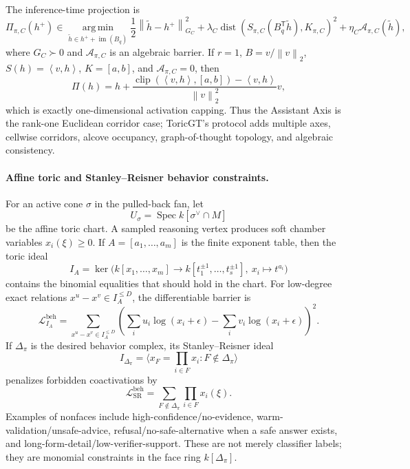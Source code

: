 \documentclass[11pt]{article}
\theoremstyle{definition}
\theoremstyle{plain}
\theoremstyle{remark}
\numberwithin{equation}{section}
\newcommand{\argmin}{\operatorname*{arg\,min}}
\newcommand{\dist}{\operatorname{dist}}
\newcommand{\norm}[1]{\left\lVert #1\right\rVert}
\newcommand{\ip}[2]{\left\langle #1,#2\right\rangle}
\newcommand{\transpose}{^{\mathsf T}}
\newcommand{\Spec}{\operatorname{Spec}}
\begin{document}
The inference-time projection is
\begin{equation}
  \Pi_{\pi,C}(h^+)
  \in
  \argmin_{\tilde h\in h^++\operatorname{im}(B_q)}
  \frac12\norm{\tilde h-h^+}_{G_C}^2
  +\lambda_C\dist(S_{\pi,C}(B_q\transpose\tilde h),K_{\pi,C})^2
  +\eta_C\mathcal A_{\pi,C}(\tilde h),
  \label{eq:bgg-behavior-projection}
\end{equation}
where $G_C\succ0$ and $\mathcal A_{\pi,C}$ is an algebraic barrier.  If $r=1$, $B=v/\norm{v}_2$, $S(h)=\ip{v}{h}$, $K=[a,b]$, and $\mathcal A_{\pi,C}=0$, then
\begin{equation}
  \Pi(h)=h+\frac{\operatorname{clip}(\ip{v}{h},[a,b])-\ip{v}{h}}{\norm{v}_2^2}v,
\end{equation}
which is exactly one-dimensional activation capping.  Thus the Assistant Axis is the rank-one Euclidean corridor case; ToricGT's protocol adds multiple axes, cellwise corridors, alcove occupancy, graph-of-thought topology, and algebraic consistency.

\paragraph{Affine toric and Stanley--Reisner behavior constraints.}
For an active cone $\sigma$ in the pulled-back fan, let
\begin{equation}
  U_\sigma=\Spec k[\sigma^\vee\cap M]
\end{equation}
be the affine toric chart.  A sampled reasoning vertex produces soft chamber variables $x_i(\xi)\ge0$.  If $A=[a_1,\ldots,a_m]$ is the finite exponent table, then the toric ideal
\begin{equation}
  I_A=\ker\bigl(k[x_1,\ldots,x_m]\to k[t_1^{\pm1},\ldots,t_s^{\pm1}],\ x_i\mapsto t^{a_i}\bigr)
\end{equation}
contains the binomial equalities that should hold in the chart.  For low-degree exact relations $x^u-x^v\in I_A^{\le D}$, the differentiable barrier is
\begin{equation}
  \mathcal L_{I_A}^{\mathrm{beh}}
  =
  \sum_{x^u-x^v\in I_A^{\le D}}
  \left(\sum_i u_i\log(x_i+\epsilon)-\sum_i v_i\log(x_i+\epsilon)\right)^2 .
\end{equation}
If $\Delta_\pi$ is the desired behavior complex, its Stanley--Reisner ideal
\begin{equation}
  I_{\Delta_\pi}=\langle x_F=\prod_{i\in F}x_i:F\notin\Delta_\pi\rangle
\end{equation}
penalizes forbidden coactivations by
\begin{equation}
  \mathcal L_{\mathrm{SR}}^{\mathrm{beh}}
  =
  \sum_{F\notin\Delta_\pi}\prod_{i\in F}x_i(\xi).
\end{equation}
Examples of nonfaces include high-confidence/no-evidence, warm-validation/unsafe-advice, refusal/no-safe-alternative when a safe answer exists, and long-form-detail/low-verifier-support.  These are not merely classifier labels; they are monomial constraints in the face ring $k[\Delta_\pi]$.
\end{document}
